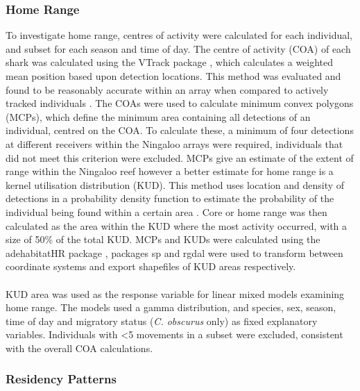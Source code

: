 \documentclass[11pt,a4paper]{article}
\begin{document}
	
	\subsubsection{Home Range}
	
	To investigate home range, centres of activity were calculated for each individual, and subset for each season and time of day. The centre of activity (COA) of each shark was calculated using the VTrack package \citep{Campbell2012}, which calculates a weighted mean position based upon detection locations. This method was evaluated and found to be reasonably accurate within an array when compared to actively tracked individuals \citep{Simpfendorfer2002}. The COAs were used to calculate minimum convex polygons (MCPs), which define the minimum area containing all detections of an individual, centred on the COA. To calculate these, a minimum of four detections at different receivers within the Ningaloo arrays were required, individuals that did not meet this criterion were excluded. MCPs give an estimate of the extent of range within the Ningaloo reef however a better estimate for home range is a kernel utilisation distribution (KUD). This method uses location and density of detections in a probability density function to estimate the probability of the individual being found within a certain area \citep{Jacoby2016}. Core or home range was then calculated as the area within the KUD where the most activity occurred, with a size of 50\% of the total KUD. MCPs and KUDs were calculated using the adehabitatHR package \citep{Calenge2006}, packages sp \citep{Pebesma2005,Bivand2013} and rgdal \citep{Bivand2019} were used to transform between coordinate systems and export shapefiles of KUD areas respectively. \\
	\\
	KUD area was used as the response variable for linear mixed models examining home range. The models used a gamma distribution, and species, sex, season, time of day and migratory status (\textit{C. obscurus} only) as fixed explanatory variables. Individuals with \textless 5 movements in a subset were excluded, consistent with the overall COA calculations.\\
	
	
	\subsubsection{Residency Patterns}
	
\end{document}
